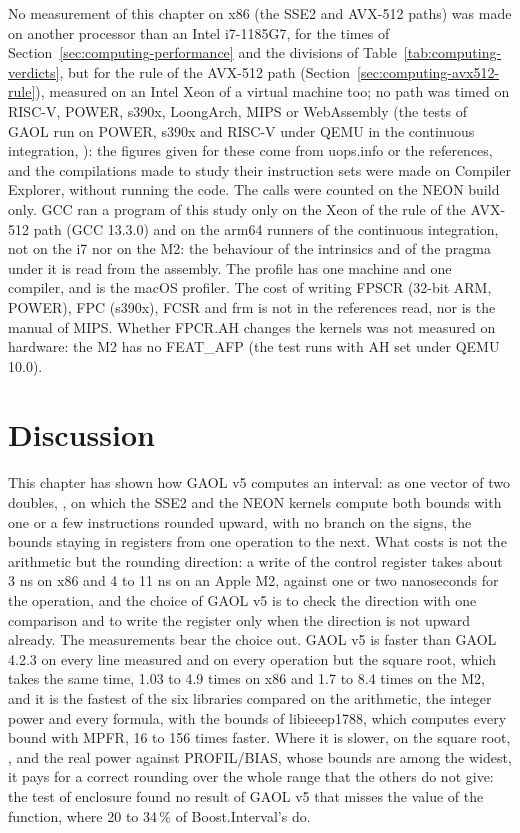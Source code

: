 No measurement of this chapter on x86 (the SSE2 and AVX-512 paths) was made on another processor than an Intel i7-1185G7, for the times of Section~\ref{sec:computing-performance} and the divisions of Table~\ref{tab:computing-verdicts}, but for the rule of the AVX-512 path (Section~\ref{sec:computing-avx512-rule}), measured on an Intel Xeon of a virtual machine too; no path was timed on RISC-V, POWER, s390x,
LoongArch, MIPS or WebAssembly (the tests of GAOL run on POWER, s390x and
RISC-V under QEMU in the continuous integration, ): the figures
given for these come from uops.info or the references, and the compilations made to study their instruction sets were made on
Compiler Explorer, without running the code. The calls
were counted on the NEON build only. GCC ran a program of this study only on the Xeon of the rule of the AVX-512 path (GCC 13.3.0) and on the arm64 runners of the continuous integration, not on the i7 nor on the M2: the behaviour of the
intrinsics and of the pragma under it is read from the assembly. The profile
has one machine and one compiler, and  is the macOS profiler.
The cost of writing FPSCR (32-bit ARM, POWER), FPC (s390x), FCSR and frm is
not in the references read, nor is the manual of MIPS. Whether FPCR.AH
changes the kernels was not measured on hardware: the M2 has no FEAT\_AFP (the
test runs with AH set under QEMU 10.0).

\section{Discussion}

This chapter has shown how GAOL v5 computes an interval: as one vector of two
doubles, , on which the SSE2 and the NEON kernels
compute both bounds with one or a few instructions rounded upward, with no
branch on the signs, the bounds staying in registers from one operation to
the next. What costs is not the arithmetic but the rounding direction: a
write of the control register takes about 3 ns on x86 and 4 to 11 ns on an
Apple M2, against one or two nanoseconds for the operation, and the choice
of GAOL v5 is to check the direction with one comparison and to write the
register only when the direction is not upward already. The measurements
bear the choice out. GAOL v5 is faster than GAOL 4.2.3 on every line measured and on every
operation but the square root, which takes the same time, 1.03 to 4.9 times on x86 and 1.7 to 8.4 times on the M2, and it is the fastest of the six libraries compared on the
arithmetic, the integer power and every formula, with the bounds of libieeep1788, which computes every bound with MPFR, 16 to 156 times faster. Where it is slower, on the square root, ,  and the real power against PROFIL/BIAS, whose bounds are among the widest, it pays for a correct rounding over the whole range that the others
do not give: the test of enclosure found no result of GAOL v5 that misses
the value of the function, where 20 to 34\,\% of Boost.Interval's do.

